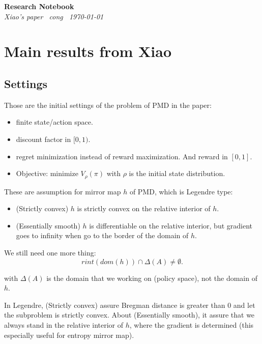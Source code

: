 \documentclass[11pt,a4paper]{article}
\begin{document}
\begin{center}
  {\Large\bfseries Research Notebook}\\[2pt]
  {\small\itshape Xiao's paper \textperiodcentered\ cong \textperiodcentered\ \today}
\end{center}
\vspace{0.5em}

\tableofcontents
\newpage

\section{Main results from Xiao}

\subsection{Settings}

Those are the initial settings of the problem of PMD in the paper:

\begin{itemize}
    \item finite state/action space.
    \item discount factor in $[0,1)$.
    \item regret minimization instead of reward maximization. And reward in $[0,1]$.
    \item Objective: minimize $V_{\rho}(\pi)$ with $\rho$ is the initial state distribution.
\end{itemize}

These are assumption for mirror map $h$ of PMD, which is Legendre type:

\begin{itemize}
    \item (Strictly convex) $h$ is strictly convex on the relative interior of $h$.
    \item (Essentially smooth) $h$ is differentiable on the relative interior, but gradient goes to infinity when go to the border of the domain of $h$. 
\end{itemize}

We still need one more thing:
\[
rint(dom (h))\cap \Delta(A) \neq \emptyset.
\]

with $\Delta(A)$ is the domain that we working on (policy space), not the domain of $h$.

In Legendre, (Strictly convex) assure Bregman distance is greater than 0 and let the subproblem is strictly convex. About (Essentially smooth), it assure that we always stand in the relative interior of $h$, where the gradient is determined (this especially useful for entropy mirror map).
\end{document}
